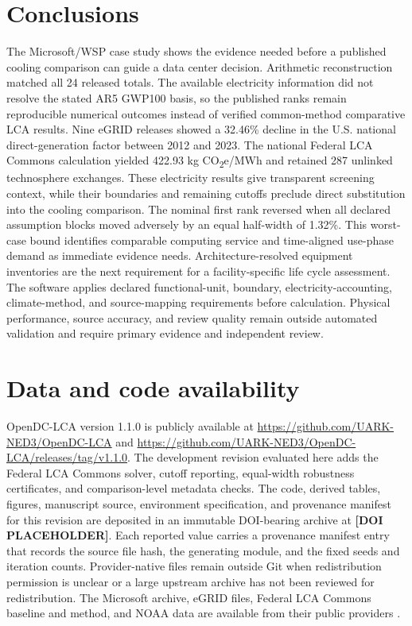 \documentclass[review,a4paper,fleqn]{cas-sc}
\newcommand{\cotwoe}{CO\textsubscript{2}e}
\begin{document}
\section{Conclusions}
The Microsoft/WSP case study shows the evidence needed before a published cooling comparison can guide a data center decision. Arithmetic reconstruction matched all 24 released totals. The available electricity information did not resolve the stated AR5 GWP100 basis, so the published ranks remain reproducible numerical outcomes instead of verified common-method comparative LCA results. Nine eGRID releases showed a 32.46\% decline in the U.S. national direct-generation factor between 2012 and 2023. The national Federal LCA Commons calculation yielded 422.93 kg \cotwoe{}/MWh and retained 287 unlinked technosphere exchanges. These electricity results give transparent screening context, while their boundaries and remaining cutoffs preclude direct substitution into the cooling comparison. The nominal first rank reversed when all declared assumption blocks moved adversely by an equal half-width of 1.32\%. This worst-case bound identifies comparable computing service and time-aligned use-phase demand as immediate evidence needs. Architecture-resolved equipment inventories are the next requirement for a facility-specific life cycle assessment. The software applies declared functional-unit, boundary, electricity-accounting, climate-method, and source-mapping requirements before calculation. Physical performance, source accuracy, and review quality remain outside automated validation and require primary evidence and independent review.

\section{Data and code availability}
OpenDC-LCA version 1.1.0 is publicly available at \url{https://github.com/UARK-NED3/OpenDC-LCA} and \url{https://github.com/UARK-NED3/OpenDC-LCA/releases/tag/v1.1.0}. The development revision evaluated here adds the Federal LCA Commons solver, cutoff reporting, equal-width robustness certificates, and comparison-level metadata checks. The code, derived tables, figures, manuscript source, environment specification, and provenance manifest for this revision are deposited in an immutable DOI-bearing archive at \textbf{[DOI PLACEHOLDER]}. Each reported value carries a provenance manifest entry that records the source file hash, the generating module, and the fixed seeds and iteration counts. Provider-native files remain outside Git when redistribution permission is unclear or a large upstream archive has not been reviewed for redistribution. The Microsoft archive, eGRID files, Federal LCA Commons baseline and method, and NOAA data are available from their public providers \cite{ref15,ref40,ref41,ref42,ref45}.
\end{document}
